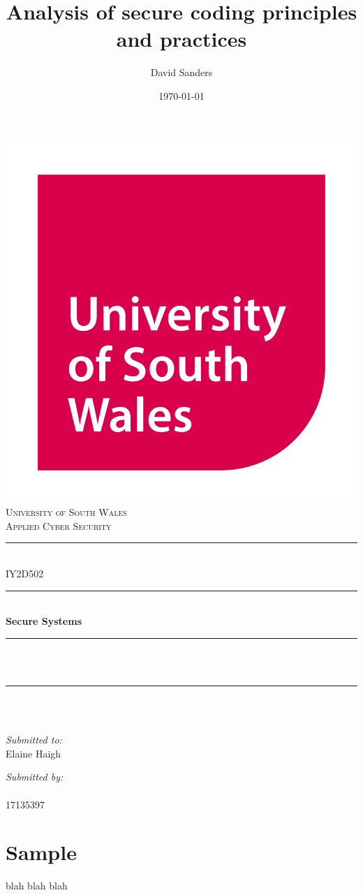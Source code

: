 \documentclass[12pt]{article}
\title{Analysis of secure coding principles and practices}
\author{David Sanders}
\date{\today}
\makeatletter
\def \unicoursename{Applied Cyber Security}
\def \unimodulecode{IY2D502}
\def \unimodulename{Secure Systems}
\def \unimodulelect{Elaine Haigh}
\def \unistudentid{17135397}
\let\thetitle\@title
\let\theauthor\@author
\let\thedate\@date
\makeatother
\begin{document}
\begin{titlepage}
  \centering
  \includegraphics[scale = 0.15]{usw_logo.jpg}\\
  \textsc{\LARGE University of South Wales\\\Large \unicoursename}\\[2cm]

  \rule{\linewidth}{0.2 mm}\\[0.5cm]
  {\huge \unimodulecode}\\
  \rule{\linewidth}{0.2 mm}\\[0.5cm]
  {\huge\bfseries \unimodulename}\\
  \rule{\linewidth}{0.2 mm}\\[0.5cm]
  \textsc{\Large \thetitle}\\
  \rule{\linewidth}{0.2 mm}\\[2cm]

  {\large \textit{\thedate}}\\[2cm]

  \begin{minipage}[t]{0.4\textwidth}
    \begin{flushleft} \large
      \textit{Submitted to:}\\
      \unimodulelect
    \end{flushleft}
  \end{minipage}
  \begin{minipage}[t]{0.4\textwidth}
    \begin{flushright} \large
      \textit{Submitted by:}\\
      \theauthor\\\unistudentid
    \end{flushright}
  \end{minipage}
\end{titlepage}


\tableofcontents
\pagebreak


\section{Sample}
blah blah blah
\end{document}
